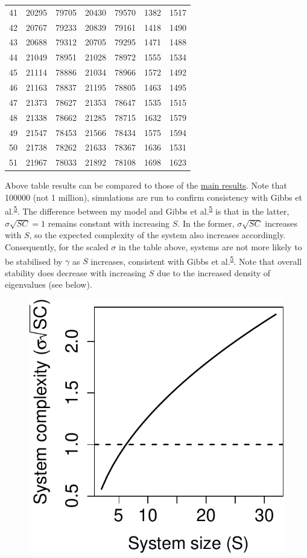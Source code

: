 \documentclass[]{article}
\begin{document}
\begin{longtable}[]{@{}rrrrrrr@{}}
41 & 20295 & 79705 & 20430 & 79570 & 1382 & 1517\tabularnewline
42 & 20767 & 79233 & 20839 & 79161 & 1418 & 1490\tabularnewline
43 & 20688 & 79312 & 20705 & 79295 & 1471 & 1488\tabularnewline
44 & 21049 & 78951 & 21028 & 78972 & 1555 & 1534\tabularnewline
45 & 21114 & 78886 & 21034 & 78966 & 1572 & 1492\tabularnewline
46 & 21163 & 78837 & 21195 & 78805 & 1463 & 1495\tabularnewline
47 & 21373 & 78627 & 21353 & 78647 & 1535 & 1515\tabularnewline
48 & 21338 & 78662 & 21285 & 78715 & 1632 & 1579\tabularnewline
49 & 21547 & 78453 & 21566 & 78434 & 1575 & 1594\tabularnewline
50 & 21738 & 78262 & 21633 & 78367 & 1636 & 1531\tabularnewline
51 & 21967 & 78033 & 21892 & 78108 & 1698 & 1623\tabularnewline
\bottomrule
\end{longtable}

Above table results can be compared to those of the
\protect\hyperlink{IncrS}{main results}. Note that 100000 (not 1
million), simulations are run to confirm consistency with Gibbs et
al.\textsuperscript{\protect\hyperlink{ref-Gibbs2017}{5}}. The
difference between my model and Gibbs et
al.\textsuperscript{\protect\hyperlink{ref-Gibbs2017}{5}} is that in the
latter, \(\sigma\sqrt{SC} = 1\) remains constant with increasing \(S\).
In the former, \(\sigma\sqrt{SC}\) increases with \(S\), so the expected
complexity of the system also increases accordingly. Consequently, for
the scaled \(\sigma\) in the table above, systems are not more likely to
be stabilised by \(\gamma\) as \(S\) increases, consistent with Gibbs et
al.\textsuperscript{\protect\hyperlink{ref-Gibbs2017}{5}}. Note that
overall stability does decrease with increasing \(S\) due to the
increased density of eigenvalues (see below).

\begin{figure}[H]

{\centering \includegraphics{SI_files/figure-latex/unnamed-chunk-34-1} 

}

\end{figure}
\end{document}
